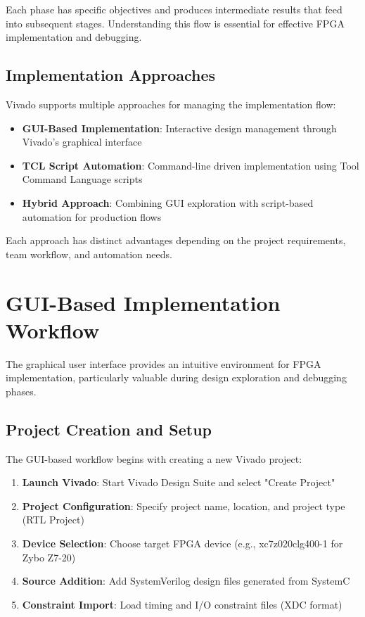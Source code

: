 Each phase has specific objectives and produces intermediate results that feed into subsequent stages. Understanding this flow is essential for effective FPGA implementation and debugging.

\subsection{Implementation Approaches}

Vivado supports multiple approaches for managing the implementation flow:

\begin{itemize}
    \item \textbf{GUI-Based Implementation}: Interactive design management through Vivado's graphical interface
    \item \textbf{TCL Script Automation}: Command-line driven implementation using Tool Command Language scripts
    \item \textbf{Hybrid Approach}: Combining GUI exploration with script-based automation for production flows
\end{itemize}

Each approach has distinct advantages depending on the project requirements, team workflow, and automation needs.

\section{GUI-Based Implementation Workflow}
\label{sec:gui_workflow}

The graphical user interface provides an intuitive environment for FPGA implementation, particularly valuable during design exploration and debugging phases.

\subsection{Project Creation and Setup}

The GUI-based workflow begins with creating a new Vivado project:

\begin{enumerate}
    \item \textbf{Launch Vivado}: Start Vivado Design Suite and select "Create Project"
    \item \textbf{Project Configuration}: Specify project name, location, and project type (RTL Project)
    \item \textbf{Device Selection}: Choose target FPGA device (e.g., xc7z020clg400-1 for Zybo Z7-20)
    \item \textbf{Source Addition}: Add SystemVerilog design files generated from SystemC
    \item \textbf{Constraint Import}: Load timing and I/O constraint files (XDC format)
\end{enumerate}

